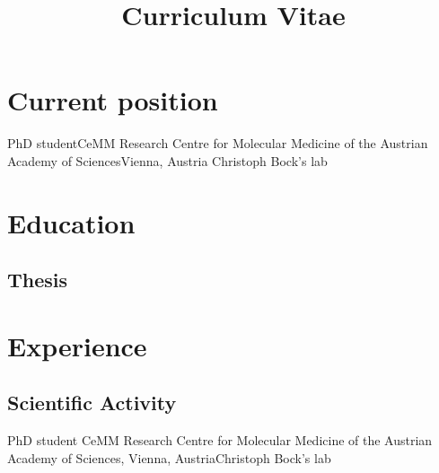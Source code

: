 \documentclass[11pt,a4paper,roman]{moderncv} %
\title{Curriculum Vitae}
\begin{document}
\makecvtitle %


\section{Current position}
	{PhD student}{CeMM Research Centre for Molecular Medicine of the Austrian Academy of Sciences}{Vienna, Austria}
	{Christoph Bock's lab}{}


\section{Education}


	\subsection{Thesis}


\section{Experience}

	\subsection{Scientific Activity}

		{PhD student}
		{CeMM Research Centre for Molecular Medicine of the Austrian Academy of Sciences, Vienna, Austria}{Christoph Bock's lab}
		{}
		{}
	
\end{document}
